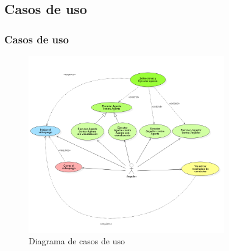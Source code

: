 \documentclass{beamer}
\begin{document}
\subsection{Casos de uso}
\begin{frame}
\frametitle{Casos de uso}
\begin{figure}[h]
	\vspace*{-0.8cm}
	\centerline{\includegraphics[width=8.5cm]{../diagramas/casosDeUsoCropped.png}}
	\caption{Diagrama de casos de uso}
	\label{casos_de_uso}
\end{figure}
\end{frame}
\end{document}
